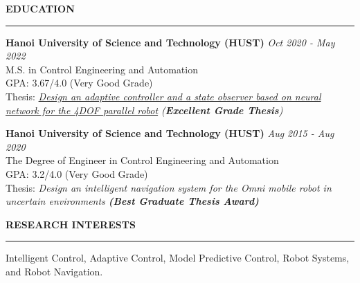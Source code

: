 \documentclass{resume} %
\renewenvironment{rSection}[1]{
\sectionskip
\textbf{\MakeUppercase{{#1}}}
\sectionlineskip
\hrule
\begin{list}{}{
\setlength{\leftmargin}{1.5em}
}
\item[]
}{
\end{list}
}
\begin{document}
\begin{rSection}{Education}
{\bf Hanoi University of Science and Technology (HUST)} \hfill {\em Oct 2020 - May 2022} 
\\ M.S. in Control Engineering and Automation\hfill
\\ GPA: 3.67/4.0 (Very Good Grade) \hfill
\\ Thesis: \textit{\href{https://www.dropbox.com/scl/fi/k664sbjnfyjsbnlwjssge/Master_Thesis_Manh_Cuong.pdf?rlkey=lwzw5knql0m4v5kx7yted5mww&st=u1favlfp&dl=0}{Design an adaptive controller and a state observer based on neural network for the 4DOF parallel robot} (\textbf{Excellent Grade Thesis})  }

{\bf Hanoi University of Science and Technology (HUST)} \hfill {\em Aug 2015 - Aug 2020} 
\\ The Degree of Engineer in Control Engineering and Automation
\\ GPA: 3.2/4.0 (Very Good Grade)   \hfill
\\ Thesis: \textit{Design an intelligent navigation system for the Omni mobile robot in uncertain environments \textbf{(Best Graduate Thesis Award)}
}

\end{rSection}

\begin{rSection}{Research Interests}
Intelligent Control, Adaptive Control, Model Predictive Control, Robot Systems, and Robot Navigation. 
\end{rSection}
\end{document}
